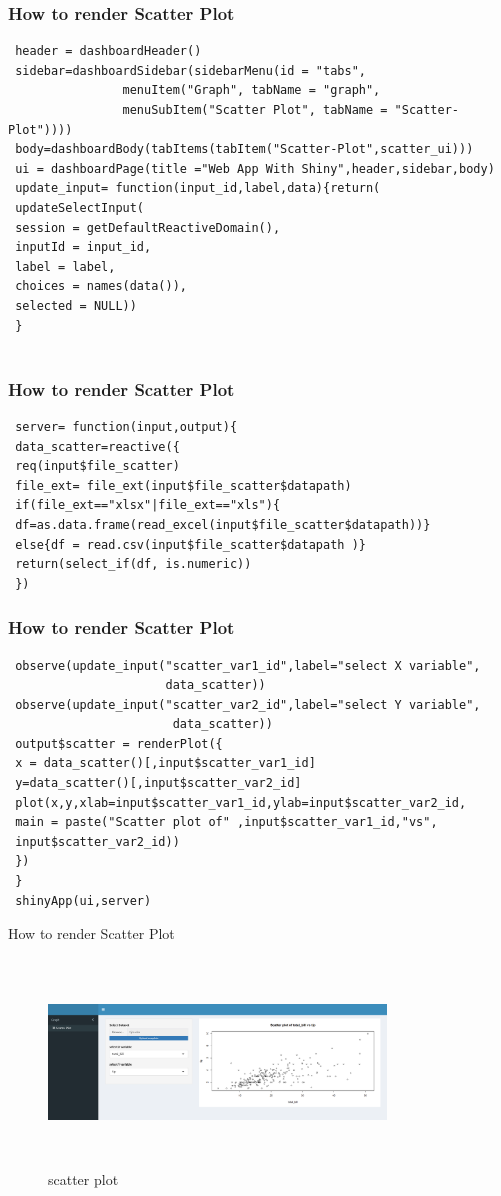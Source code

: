 \documentclass[aspectratio=169,serif,professionalfont]{beamer}
\begin{document}
\begin{frame}[fragile]
  \frametitle{How to render Scatter Plot}
\begin{verbatim}
 header = dashboardHeader()
 sidebar=dashboardSidebar(sidebarMenu(id = "tabs",
                menuItem("Graph", tabName = "graph",
                menuSubItem("Scatter Plot", tabName = "Scatter-Plot"))))
 body=dashboardBody(tabItems(tabItem("Scatter-Plot",scatter_ui)))
 ui = dashboardPage(title ="Web App With Shiny",header,sidebar,body)
 update_input= function(input_id,label,data){return(
 updateSelectInput(
 session = getDefaultReactiveDomain(),
 inputId = input_id,
 label = label,
 choices = names(data()),
 selected = NULL))
 }
 
\end{verbatim}
\end{frame}

\begin{frame}[fragile]
  \frametitle{How to render Scatter Plot}
\begin{verbatim}
 server= function(input,output){
 data_scatter=reactive({
 req(input$file_scatter)
 file_ext= file_ext(input$file_scatter$datapath)
 if(file_ext=="xlsx"|file_ext=="xls"){
 df=as.data.frame(read_excel(input$file_scatter$datapath))}
 else{df = read.csv(input$file_scatter$datapath )}
 return(select_if(df, is.numeric))
 })

\end{verbatim}
\end{frame}

\begin{frame}[fragile]
  \frametitle{How to render Scatter Plot}
\begin{verbatim}
 observe(update_input("scatter_var1_id",label="select X variable",
                      data_scatter))
 observe(update_input("scatter_var2_id",label="select Y variable",
                       data_scatter))
 output$scatter = renderPlot({
 x = data_scatter()[,input$scatter_var1_id]
 y=data_scatter()[,input$scatter_var2_id]
 plot(x,y,xlab=input$scatter_var1_id,ylab=input$scatter_var2_id,
 main = paste("Scatter plot of" ,input$scatter_var1_id,"vs",
 input$scatter_var2_id))
 })
 }
 shinyApp(ui,server)
\end{verbatim}
\end{frame}

\begin{frame}{How to render Scatter Plot}
   \begin{figure}[htbp]
    \centering
    \includegraphics[width=0.8\textwidth,height=5.5cm]{scatter.png}
    \caption{scatter plot}
    \label{fig:image_label10}
   \end{figure}
\end{frame}
\end{document}
